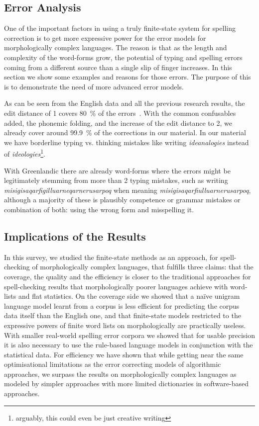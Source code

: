 \documentclass[a4paper,12pt]{article}
\begin{document}
\subsection{Error Analysis}
\label{subsec:error-analysis}

One of the important factors in using a truly finite-state system for
spelling correction is to get more expressive power for the error models for
morphologically complex languages. The reason is that as the length and
complexity of the word-forms grow, the potential of typing and spelling errors
coming from a different source than a single slip of finger increases. In this
section we show some examples and reasons for those errors. The purpose of
this is to demonstrate the need of more advanced error models.

As can be seen from the English data and all the previous research results, the
edit distance of 1 covers 80~\% of the errors~\cite{damerau/1964}. With the
common confusables added, the phonemic folding, and the increase of the edit
distance to 2, we already cover around 99.9~\% of the corrections in our
material. In our material we have borderline typing vs. thinking
mistakes like writing \emph{ideanalogies} instead of
\emph{ideologies}\footnote{arguably, this could even be just creative writing}.

With Greenlandic there are already word-forms where the errors might be
legitimately stemming from more than 2 typing mistakes, such as writing 
\emph{misigisaqarfigilluarneqarnerusarpoq} when meaning 
\emph{misigisaqarfiulluarnerusarpoq}, although a majority of these is plausibly
competence or grammar mistakes or combination of both: using the wrong form and
misspelling it.


\subsection{Implications of the Results}

In this survey, we studied the finite-state methods as an approach, for
spell-checking of morphologically complex languages, that fulfills three
claims: that the coverage, the quality and the efficiency is closer to the
traditional approaches for spell-checking results that morphologically
poorer languages achieve with word-lists and flat statistics. On the coverage
side we showed that a naïve unigram language model learnt from a corpus is
less efficient for predicting the corpus data itself than the English one,
and that finite-state models restricted to the expressive powers of finite
word lists on morphologically are practically useless. With smaller real-world
spelling error corpora we showed that for usable precision it is also necessary
to use the rule-based language models in conjunction with the statistical
data. For efficiency we have shown that while getting near the same
optimisational limitations as the error correcting models of algorithmic
approaches, we surpass the results on morphologically complex 
languages as modeled by simpler approaches with more limited dictionaries in
software-based approaches.
\end{document}
